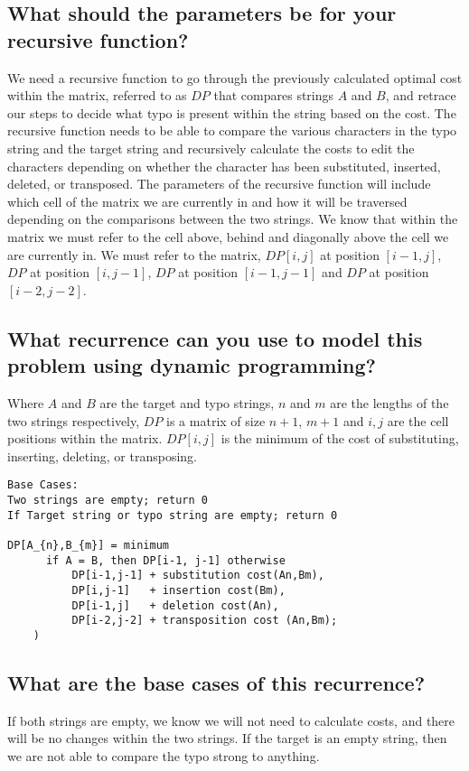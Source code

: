\documentclass[letterpaper,12pt]{article}
\begin{document}
\subsection{What should the parameters be for your recursive function?}
We need a recursive function to go through the previously calculated optimal cost within the matrix, referred to as $DP$ that compares strings $A$ and $B$, and retrace our steps to decide what typo is present within the string based on the cost. The recursive function needs to be able to compare the various characters in the typo string and the target string and recursively calculate the costs to edit the characters depending on whether the character has been substituted, inserted, deleted, or transposed. The parameters of the recursive function will include which cell of the matrix we are currently in and how it will be traversed depending on the comparisons between the two strings. We know that within the matrix we must refer to the cell above, behind and diagonally above the cell we are currently in. We must refer to the matrix, $DP[i,j]$ at position $[i-1, j]$, $DP$ at position $[i, j-1]$, $DP$ at position $[i-1, j-1]$ and $DP$ at position $[i-2, j-2]$.

\subsection{What recurrence can you use to model this problem using dynamic programming?}
Where $A$ and $B$ are the target and typo strings, $n$ and $m$ are the lengths of the two strings respectively, $DP$ is a matrix of size $n+1$, $m+1$ and $i,j$ are the cell positions within the matrix. $DP[i,j]$ is the minimum of the cost of substituting, inserting, deleting, or transposing. 
\newline
\begin{lstlisting}
Base Cases:
Two strings are empty; return 0 
If Target string or typo string are empty; return 0 

DP[A_{n},B_{m}] = minimum
      if A = B, then DP[i-1, j-1] otherwise
    	  DP[i-1,j-1] + substitution cost(An,Bm),
    	  DP[i,j-1]   + insertion cost(Bm),
    	  DP[i-1,j]   + deletion cost(An),
    	  DP[i-2,j-2] + transposition cost (An,Bm);
	)
\end{lstlisting}

\subsection{What are the base cases of this recurrence?}
If both strings are empty, we know we will not need to calculate costs, and there will be no changes within the two strings. If the target is an empty string, then we are not able to compare the typo strong to anything. 
\end{document}
